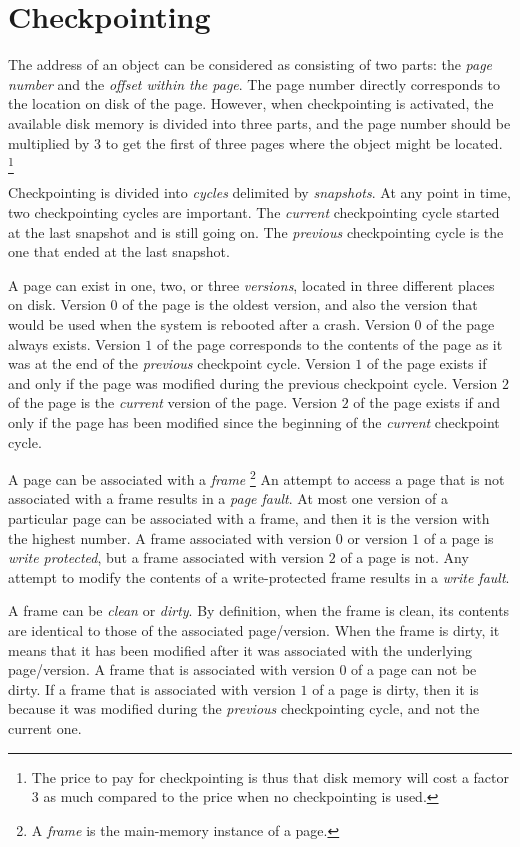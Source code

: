 \chapter{Checkpointing}
\label{chap-checkpointing}

The address of an object can be considered as consisting of two parts:
the \emph{page number} and the \emph{offset within the page}.  The
page number directly corresponds to the location on disk of the page.
However, when checkpointing is activated, the available disk memory is
divided into three parts, and the page number should be multiplied by
3 to get the first of three pages where the object might be located.%
\footnote{The price to pay for checkpointing is thus that disk memory
  will cost a factor 3 as much compared to the price when no
  checkpointing is used.}

Checkpointing is divided into \emph{cycles} delimited by
\emph{snapshots}.  At any point in time, two checkpointing cycles are
important.  The \emph{current} checkpointing cycle started at the
last snapshot and is still going on.  The \emph{previous}
checkpointing cycle is the one that ended at the last snapshot. 

A page can exist in one, two, or three \emph{versions}, located in
three different places on disk.  Version $0$ of the page is the oldest
version, and also the version that would be used when the system is
rebooted after a crash.  Version $0$ of the page always exists.
Version $1$ of the page corresponds to the contents of the page as it
was at the end of the \emph{previous} checkpoint cycle.  Version $1$
of the page exists if and only if the page was modified during the
previous checkpoint cycle.  Version $2$ of the page is the
\emph{current} version of the page.  Version $2$ of the page exists if
and only if the page has been modified since the beginning of the
\emph{current} checkpoint cycle.

A page can be associated with a \emph{frame}%
\footnote{A \emph{frame} is the main-memory instance of a page.}  An
attempt to access a page that is not associated with a frame results
in a \emph{page fault}.  At most one version of a particular page can
be associated with a frame, and then it is the version with the
highest number.  A frame associated with version $0$ or version $1$ of
a page is \emph{write protected}, but a frame associated with version
$2$ of a page is not.  Any attempt to modify the contents of a
write-protected frame results in a \emph{write fault}.

A frame can be \emph{clean} or \emph{dirty}.  By definition, when the
frame is clean, its contents are identical to those of the associated
page/version.  When the frame is dirty, it means that it has been
modified after it was associated with the underlying page/version.  A
frame that is associated with version $0$ of a page can not be dirty.
If a frame that is associated with version $1$ of a page is dirty,
then it is because it was modified during the \emph{previous}
checkpointing cycle, and not the current one.

